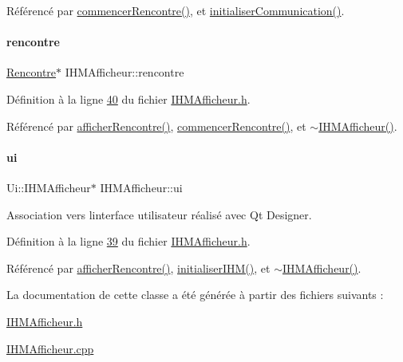 Référencé par \hyperlink{_i_h_m_afficheur_8cpp_source_l00090}{commencer\+Rencontre()}, et \hyperlink{_i_h_m_afficheur_8cpp_source_l00074}{initialiser\+Communication()}.

\mbox{\label{class_i_h_m_afficheur_aef34d340f7ea30f049a98efc47bd9779}} 
\paragraph{\texorpdfstring{rencontre}{rencontre}}
{\footnotesize\ttfamily \hyperlink{class_rencontre}{Rencontre}$\ast$ I\+H\+M\+Afficheur\+::rencontre\hspace{0.3cm}{\ttfamily [private]}}



Définition à la ligne \hyperlink{_i_h_m_afficheur_8h_source_l00040}{40} du fichier \hyperlink{_i_h_m_afficheur_8h_source}{I\+H\+M\+Afficheur.\+h}.



Référencé par \hyperlink{_i_h_m_afficheur_8cpp_source_l00100}{afficher\+Rencontre()}, \hyperlink{_i_h_m_afficheur_8cpp_source_l00090}{commencer\+Rencontre()}, et \hyperlink{_i_h_m_afficheur_8cpp_source_l00043}{$\sim$\+I\+H\+M\+Afficheur()}.

\mbox{\label{class_i_h_m_afficheur_a26ca43f1ff87b1caa2191adcce444d23}} 
\paragraph{\texorpdfstring{ui}{ui}}
{\footnotesize\ttfamily Ui\+::\+I\+H\+M\+Afficheur$\ast$ I\+H\+M\+Afficheur\+::ui\hspace{0.3cm}{\ttfamily [private]}}



Association vers l\textquotesingle{}interface utilisateur réalisé avec Qt Designer. 



Définition à la ligne \hyperlink{_i_h_m_afficheur_8h_source_l00039}{39} du fichier \hyperlink{_i_h_m_afficheur_8h_source}{I\+H\+M\+Afficheur.\+h}.



Référencé par \hyperlink{_i_h_m_afficheur_8cpp_source_l00100}{afficher\+Rencontre()}, \hyperlink{_i_h_m_afficheur_8cpp_source_l00056}{initialiser\+I\+H\+M()}, et \hyperlink{_i_h_m_afficheur_8cpp_source_l00043}{$\sim$\+I\+H\+M\+Afficheur()}.



La documentation de cette classe a été générée à partir des fichiers suivants \+:\begin{DoxyCompactItemize}
\item 
\hyperlink{_i_h_m_afficheur_8h}{I\+H\+M\+Afficheur.\+h}\item 
\hyperlink{_i_h_m_afficheur_8cpp}{I\+H\+M\+Afficheur.\+cpp}\end{DoxyCompactItemize}
